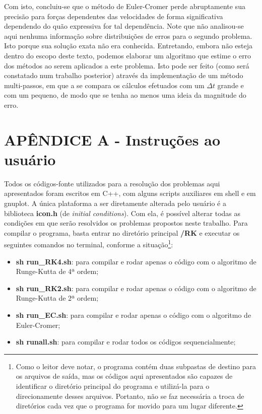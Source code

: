 \documentclass[a4paper, brazilian, 8pt, final]{article}
\begin{document}
\begin{multicols}{2}
\quad Com isto, concluiu-se que o método de Euler-Cromer perde abruptamente sua precisão para forças dependentes das velocidades de forma significativa dependendo do quão expressiva for tal dependência. Note que não analisou-se aqui nenhuma informação sobre distribuições de erros para o segundo problema. Isto porque sua solução exata não era conhecida. Entretando, embora não esteja dentro do escopo deste texto, podemos elaborar um algoritmo que estime o erro dos métodos ao serem aplicados a este problema. Isto pode ser feito (como será constatado num trabalho posterior) através da implementação de um método multi-passos, em que a se compara os cálculos efetuados com um $\Delta t$ grande e com um pequeno, de modo que se tenha ao menos uma ideia da magnitude do erro. 

\section*{APÊNDICE A - Instruções ao usuário}
\quad Todos os códigos-fonte utilizados para a resolução dos problemas aqui apresentados foram escritos em C++, com alguns scripts auxiliares em shell e em gnuplot. A única plataforma a ser diretamente alterada pelo usuário é a biblioteca \textbf{icon.h} (de \textit{initial conditions}). Com ela, é possível alterar todas as condições em que serão resolvidos os problemas propostos neste trabalho. Para compilar o programa, basta entrar no diretório principal \textbf{/RK} e executar os seguintes comandos no terminal, conforme a situação\footnote{Como o leitor deve notar, o programa contém duas subpastas de destino para os arquivos de saída, mas os códigos aqui apresentados são capazes de identificar o diretório principal do programa e utilizá-la para o direcionamente desses arquivos. Portanto, não se faz necessária a troca de diretórios cada vez que o programa for movido para um lugar diferente.}:

\begin{itemize}
\item{\textbf{sh run\_RK4.sh}: para compilar e rodar apenas o código com o algoritmo de Runge-Kutta de 4ª ordem;}
\item{\textbf{sh run\_RK2.sh}: para compilar e rodar apenas o código com o algoritmo de Runge-Kutta de 2ª ordem;}
\item{\textbf{sh run\_EC.sh}: para compilar e rodar apenas o código com o algoritmo de Euler-Cromer;}
\item{\textbf{sh runall.sh}: para compilar e rodar todos os códigos sequencialmente;}
\end{itemize} 


\end{multicols}
\end{document}
